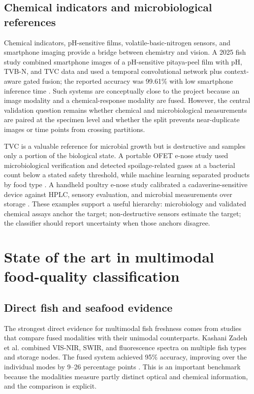 \documentclass[11pt]{article}
\begin{document}
\subsection{Chemical indicators and microbiological references}

Chemical indicators, pH-sensitive films, volatile-basic-nitrogen sensors, and smartphone imaging provide a bridge between chemistry and vision. A 2025 fish study combined smartphone images of a pH-sensitive pitaya-peel film with pH, TVB-N, and TVC data and used a temporal convolutional network plus context-aware gated fusion; the reported accuracy was 99.61\% with low smartphone inference time \citep{Pan2025smartphone}. Such systems are conceptually close to the project because an image modality and a chemical-response modality are fused. However, the central validation question remains whether chemical and microbiological measurements are paired at the specimen level and whether the split prevents near-duplicate images or time points from crossing partitions.

TVC is a valuable reference for microbial growth but is destructive and samples only a portion of the biological state. A portable OFET e-nose study used microbiological verification and detected spoilage-related gases at a bacterial count below a stated safety threshold, while machine learning separated products by food type \citep{Anisimov2023food}. A handheld poultry e-nose study calibrated a cadaverine-sensitive device against HPLC, sensory evaluation, and microbial measurements over storage \citep{Ferrier2024application}. These examples support a useful hierarchy: microbiology and validated chemical assays anchor the target; non-destructive sensors estimate the target; the classifier should report uncertainty when those anchors disagree.

\section{State of the art in multimodal food-quality classification}

\subsection{Direct fish and seafood evidence}

The strongest direct evidence for multimodal fish freshness comes from studies that compare fused modalities with their unimodal counterparts. Kashani Zadeh et al. combined VIS-NIR, SWIR, and fluorescence spectra on multiple fish types and storage nodes. The fused system achieved 95\% accuracy, improving over the individual modes by 9--26 percentage points \citep{KashaniZadeh2023rapid}. This is an important benchmark because the modalities measure partly distinct optical and chemical information, and the comparison is explicit.
\end{document}
